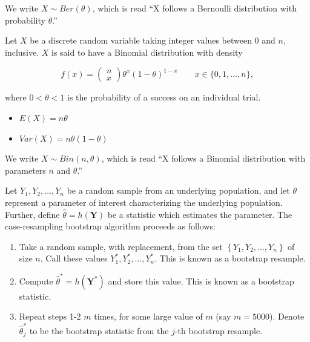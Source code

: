 \documentclass[
  letterpaper,
  DIV=11,
  numbers=noendperiod]{scrreprt}
\providecommand{\tightlist}{%
  \setlength{\itemsep}{0pt}\setlength{\parskip}{0pt}}\usepackage{longtable,booktabs,array}
\theoremstyle{definition}
\theoremstyle{plain}
\theoremstyle{definition}
\theoremstyle{remark}
\begin{document}
We write \(X \sim Ber(\theta)\), which is read ``X follows a Bernoulli
distribution with probability \(\theta\).''

\begin{description}
\tightlist
\item[Binomial Distribution
(Definition~\ref{def-binomial-distribution})]
Let \(X\) be a discrete random variable taking integer values between 0
and \(n\), inclusive. \(X\) is said to have a Binomial distribution with
density
\end{description}

\[f(x) = \begin{pmatrix}n \\ x\end{pmatrix} \theta^x (1 - \theta)^{1 - x} \qquad x \in \{0, 1, \dotsc, n\},\]

where \(0 < \theta < 1\) is the probability of a success on an
individual trial.

\begin{itemize}
\tightlist
\item
  \(E(X) = n\theta\)
\item
  \(Var(X) = n\theta(1 - \theta)\)
\end{itemize}

We write \(X \sim Bin(n, \theta)\), which is read ``X follows a Binomial
distribution with parameters \(n\) and \(\theta\).''

\begin{description}
\tightlist
\item[Case-Resampling Bootstrap (Definition~\ref{def-case-bootstrap})]
Let \(Y_1, Y_2, \dotsc, Y_n\) be a random sample from an underlying
population, and let \(\theta\) represent a parameter of interest
characterizing the underlying population. Further, define
\(\widehat{\theta} = h(\mathbf{Y})\) be a statistic which estimates the
parameter. The case-resampling bootstrap algorithm proceeds as follows:
\end{description}

\begin{enumerate}
\def\labelenumi{\arabic{enumi}.}
\tightlist
\item
  Take a random sample, with replacement, from the set
  \(\left\{Y_1, Y_2, \dotsc, Y_n\right\}\) of size \(n\). Call these
  values \(Y_1^*, Y_2^*, \dotsc, Y_n^*\). This is known as a bootstrap
  resample.
\item
  Compute \(\widehat{\theta}^* = h\left(\mathbf{Y}^*\right)\) and store
  this value. This is known as a bootstrap statistic.
\item
  Repeat steps 1-2 \(m\) times, for some large value of \(m\) (say
  \(m = 5000\)). Denote \(\widehat{\theta}^*_j\) to be the bootstrap
  statistic from the \(j\)-th bootstrap resample.
\end{enumerate}
\end{document}
